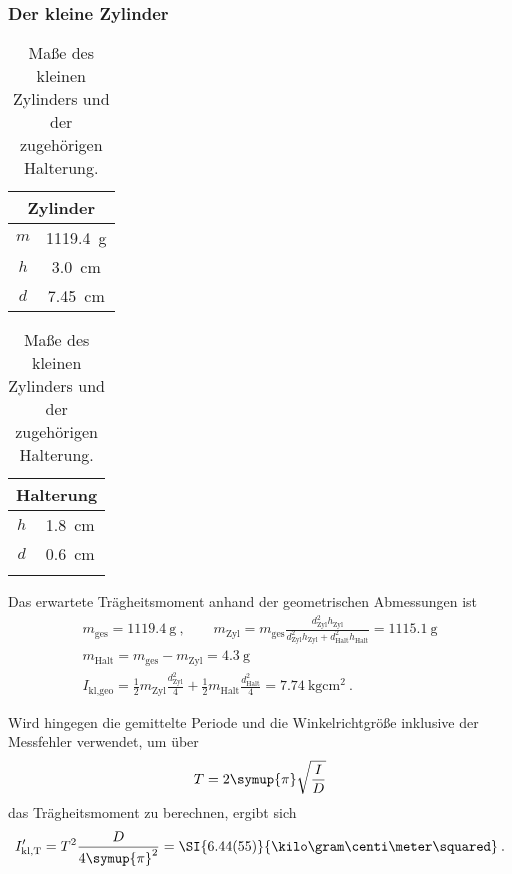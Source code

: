 \FloatBarrier
\subsubsection{Der kleine Zylinder}

\begin{table}
    \centering
    \caption{Maße des kleinen Zylinders und der zugehörigen Halterung.}
    \label{tab:kleZyl}
    \begin{tabular}{c c}
        \toprule
        \multicolumn{2}{c}{Zylinder} \\
        \midrule
        $m$ & \SI{1119.4}{\gram} \\
        $h$ & \SI{3.0}{\centi\meter} \\
        $d$ & \SI{7.45}{\centi\meter} \\
        \bottomrule
    \end{tabular}
    \qquad \qquad 
    \begin{tabular}{c c}
        \toprule
        \multicolumn{2}{c}{Halterung}\\
        \midrule
        $h$ & \SI{1.8}{\centi\meter} \\
        $d$ & \SI{0.6}{\centi\meter} \\
        \bottomrule
            \\
    \end{tabular}
\end{table}

Das erwartete Trägheitsmoment anhand der geometrischen Abmessungen ist 
\begin{gather}
    m_\text{ges}=\SI{1119.4}{\gram}\:, \qquad 
    m_\text{Zyl}=m_\text{ges}\frac{d_\text{Zyl}^2h_\text{Zyl}}{d_\text{Zyl}^2h_\text{Zyl}+d_\text{Halt}^2h_\text{Halt}}=\SI{1115.1}{\gram} \\
    m_\text{Halt} = m_\text{ges}-m_\text{Zyl}=\SI{4.3}{\gram} \\
    I_\text{kl,geo}=\frac{1}{2}m_\text{Zyl}\frac{d_\text{Zyl}^2}{4}+\frac{1}{2}m_\text{Halt}\frac{d_\text{Halt}^2}{4}=\SI{7.74}{\kilo\gram\centi\meter\squared}\:.
\end{gather}

Wird hingegen die gemittelte Periode und die Winkelrichtgröße inklusive der Messfehler verwendet, um über 
\begin{equation}
    T=2\symup{\pi}\sqrt{\frac{I}{D}}
\end{equation}
das Trägheitsmoment zu berechnen, ergibt sich 
\begin{equation}
    I'_\text{kl,T}=T^2\frac{D}{4\symup{\pi}^2}=\SI{6.44(55)}{\kilo\gram\centi\meter\squared}\:.
\end{equation}

